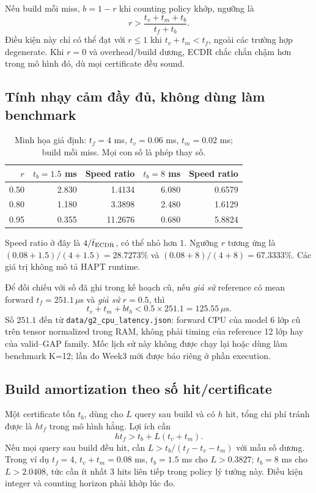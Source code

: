 \documentclass[11pt,a4paper]{article}
\newcommand{\code}[1]{{\small\ttfamily\nolinkurl{#1}}}
\theoremstyle{remark}
\begin{document}
Nếu build mỗi miss, $b=1-r$ khi counting policy khớp, ngưỡng là
\begin{equation}
 r>\frac{t_v+t_m+t_b}{t_f+t_b}.
\end{equation}
Điều kiện này chỉ có thể đạt với $r\le1$ khi $t_v+t_m<t_f$, ngoài các
trường hợp degenerate. Khi $r=0$ và overhead/build dương, ECDR chắc chắn
chậm hơn trong mô hình đó, dù mọi certificate đều sound.

\subsection{Tính nhạy cảm đầy đủ, không dùng làm benchmark}
\begin{table}[!htbp]\centering
\caption{Minh họa giả định: $t_f=4$ ms, $t_v=0.06$ ms,
$t_m=0.02$ ms; build mỗi miss. Mọi con số là phép thay số.}
\begin{tabular}{@{}rrrrr@{}}\toprule
$r$ & $t_b=1.5$ ms & Speed ratio & $t_b=8$ ms & Speed ratio\\\midrule
0.50 &2.830&1.4134&6.080&0.6579\\
0.80 &1.180&3.3898&2.480&1.6129\\
0.95 &0.355&11.2676&0.680&5.8824\\\bottomrule
\end{tabular}
\end{table}
Speed ratio ở đây là $4/\bar t_{\rm ECDR}$, có thể nhỏ hơn 1.
Ngưỡng $r$ tương ứng là $(0.08+1.5)/(4+1.5)=28.7273\%$ và
$(0.08+8)/(4+8)=67.3333\%$. Các giá trị không mô tả HAPT runtime.

Để đối chiếu với số đã ghi trong kế hoạch cũ, nếu \emph{giả sử} reference
có mean forward $t_f=251.1\,\mu$s và \emph{giả sử} $r=0.5$, thì
\begin{equation}
 t_v+t_m+bt_b<0.5\times251.1=125.55\,\mu\mathrm{s}.
\end{equation}
Số $251.1$ đến từ \code{data/g2_cpu_latency.json}: forward CPU của model
6 lớp cũ trên tensor normalized trong RAM, không phải timing của reference
12 lớp hay của valid--GAP family. Mốc lịch sử này không được chạy lại hoặc dùng làm benchmark K=12; lần đo Week3 mới được báo riêng ở phần execution.

\subsection{Build amortization theo số hit/certificate}
Một certificate tốn $t_b$, dùng cho $L$ query sau build và có $h$ hit, tổng
chi phí tránh được là $ht_f$ trong mô hình hằng. Lợi ích cần
\begin{equation}
 ht_f>t_b+L(t_v+t_m).
\end{equation}
Nếu mọi query sau build đều hit, cần
$L>t_b/(t_f-t_v-t_m)$ với mẫu số dương. Trong ví dụ $t_f=4$,
$t_v+t_m=0.08$ ms, $t_b=1.5$ ms cho $L>0.3827$; $t_b=8$ ms cho
$L>2.0408$, tức cần ít nhất 3 hits liên tiếp trong policy lý tưởng này.
Điều kiện integer và counting horizon phải khớp lúc đo.
\end{document}
